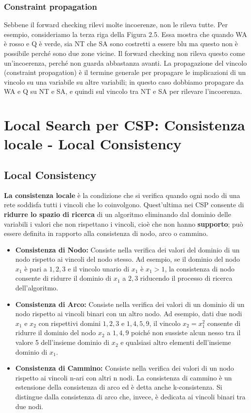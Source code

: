 \subsection{Constraint propagation}
Sebbene il forward checking rilevi molte incoerenze, non le rileva tutte. Per
esempio, consideriamo la terza riga della Figura 2.5. Essa mostra che quando WA
è rosso e Q è verde, sia NT che SA sono costretti a essere blu ma questo non è
possibile perché sono due zone vicine. Il forward checking non rileva questo
come un'incoerenza, perché non guarda abbastanza avanti. La propagazione del
vincolo (constraint propagation) è il termine generale per propagare le
implicazioni di un vincolo su una variabile su altre variabili; in questo caso
dobbiamo propagare da WA e Q su NT e SA, e quindi sul vincolo tra NT e SA per
rilevare l'incoerenza.

\chapter{Local Search per CSP: Consistenza locale - Local Consistency}
\label{ch:Local Search per Crisp CSP: Consistenza locale}
\section{Local Consistency}
\textbf{La consistenza locale} è la condizione che si verifica quando ogni nodo
di una rete soddisfa tutti i vincoli che lo coinvolgono. Quest'ultima nei CSP
consente di \textbf{ridurre lo spazio di ricerca} di un algoritmo eliminando dal
dominio delle variabili i valori che non rispettano i vincoli, cioè che non
hanno \textbf{supporto}; può essere definita in rapporto alla consistenza di
nodo, arco o cammino.
\begin{itemize}
    \item \textbf{Consistenza di Nodo:} Consiste nella verifica dei valori del
          dominio di un nodo rispetto ai vincoli del nodo stesso. Ad esempio, se il
          dominio del nodo $x_1$ è pari a $1,2,3$ e il vincolo unario di $x_1$ è $x_1 >
              1$, la consistenza di nodo consente di ridurre il dominio di $x_1$ a $2,3$
          riducendo il processo di ricerca dell'algoritmo.
    \item \textbf{Consistenza di Arco:} Consiste nella verifica dei valori di un
          dominio di un nodo rispetto ai vincoli binari con un altro nodo. Ad esempio,
          dati due nodi $x_1$ e $x_2$ con rispettivi domini $1,2,3$ e $1,4,5,9$, il
          vincolo $x_2 = x_{1}^2$ consente di ridurre il dominio del nodo $x_2$ a $1,4,9$
          poiché non sussiste alcun nesso tra il valore 5 dell'insieme dominio di
          $x_2$ e qualsiasi altro elementi dell'insieme dominio di $x_1$.
    \item \textbf{Consistenza di Cammino:} Consiste nella verifica dei valori di
          un nodo rispetto ai vincoli n-ari con altri n nodi. La consistenza di
          cammino è un estensione della consistenza di arco ed è detta anche
          k-consistenza. Si distingue dalla consistenza di arco che, invece, è
          dedicata ai vincoli binari tra due nodi.
\end{itemize}

